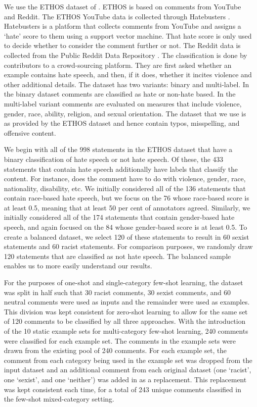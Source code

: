 \documentclass[12pt,]{article}
\begin{document}
We use the ETHOS dataset of \citet{mollas2020ethos}. ETHOS is based on comments from YouTube and Reddit. The ETHOS YouTube data is collected through Hatebusters \citep{anagnostou2018hatebusters}. Hatebusters is a platform that collects comments from YouTube and assigns a `hate' score to them using a support vector machine. That hate score is only used to decide whether to consider the comment further or not. The Reddit data is collected from the Public Reddit Data Repository \citep{baumgartner2020pushshift}. The classification is done by contributors to a crowd-sourcing platform. They are first asked whether an example contains hate speech, and then, if it does, whether it incites violence and other additional details. The dataset has two variants: binary and multi-label. In the binary dataset comments are classified as hate or non-hate based. In the multi-label variant comments are evaluated on measures that include violence, gender, race, ability, religion, and sexual orientation. The dataset that we use is as provided by the ETHOS dataset and hence contain typos, misspelling, and offensive content.

We begin with all of the 998 statements in the ETHOS dataset that have a binary classification of hate speech or not hate speech. Of these, the 433 statements that contain hate speech additionally have labels that classify the content. For instance, does the comment have to do with violence, gender, race, nationality, disability, etc. We initially considered all of the 136 statements that contain race-based hate speech, but we focus on the 76 whose race-based score is at least 0.5, meaning that at least 50 per cent of annotators agreed. Similarly, we initially considered all of the 174 statements that contain gender-based hate speech, and again focused on the 84 whose gender-based score is at least 0.5. To create a balanced dataset, we select 120 of these statements to result in 60 sexist statements and 60 racist statements. For comparison purposes, we randomly draw 120 statements that are classified as not hate speech. The balanced sample enables us to more easily understand our results.

For the purposes of one-shot and single-category few-shot learning, the dataset was split in half such that 30 racist comments, 30 sexist comments, and 60 neutral comments were used as inputs and the remainder were used as examples. This division was kept consistent for zero-shot learning to allow for the same set of 120 comments to be classified by all three approaches. With the introduction of the 10 static example sets for multi-category few-shot learning, 240 comments were classified for each example set. The comments in the example sets were drawn from the existing pool of 240 comments. For each example set, the comment from each category being used in the example set was dropped from the input dataset and an additional comment from each original dataset (one `racist', one `sexist', and one `neither') was added in as a replacement. This replacement was kept consistent each time, for a total of 243 unique comments classified in the few-shot mixed-category setting.
\end{document}
